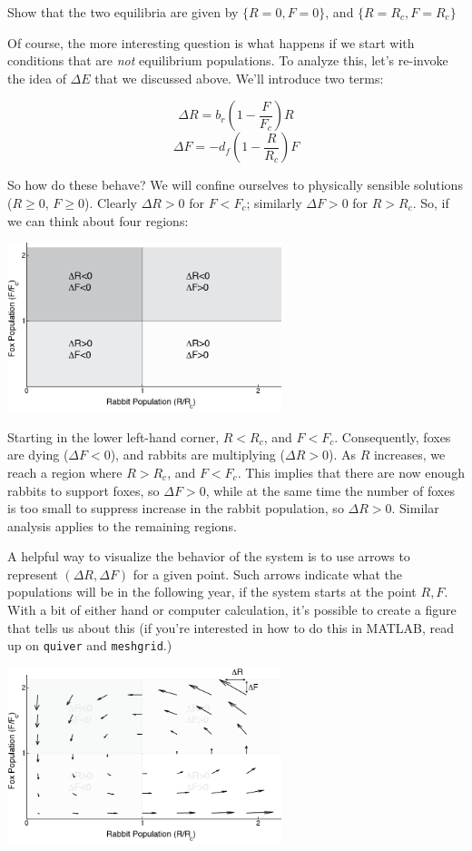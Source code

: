 \begin{del}
Show that the two equilibria are given by  $\{R=0, F=0\} $, and $\{R=R_c, F=R_c\} $ 
\end{del}

Of course, the more interesting question is what happens if we start with conditions that are {\it not} equilibrium populations.  To analyze this, let's re-invoke the idea of $\Delta E$ that we discussed above.  We'll introduce two terms:

$$\Delta R = b_r (1 - \frac{F}{F_c}) R$$
$$\Delta F= - d_f (1-\frac{R}{R_c}) F$$

So how do these behave?  We will confine ourselves to physically sensible solutions ($R\geq 0$, $F\geq 0$).  Clearly $\Delta R >0$ for $F<F_c$; similarly $\Delta F  > 0$ for $R>R_c$.  So, if we can think about four regions:

\beforefig
\centerline{\includegraphics[width=8cm]{figs/FoxRabbitPhasePlaneRegions}}
\afterfig

Starting in the lower left-hand corner, $R<R_c$, and $F<F_c$.  Consequently, foxes are dying ($\Delta F<0$), and rabbits are multiplying ($\Delta R>0$).  As $R$ increases, we reach a region where  $R>R_c$, and $F<F_c$.  This implies that there are now enough rabbits to support foxes, so $\Delta F>0$, while at the same time the number of foxes is too small to suppress increase in the rabbit population, so $\Delta R>0$.  Similar analysis applies to the remaining regions.

A helpful way to visualize the behavior of the system is to use arrows to represent $(\Delta R, \Delta F)$ for a given point.  Such arrows indicate what the populations will be in the following year, if the system starts at the point $R,F$.  With a bit of either hand or computer calculation, it's possible to create a figure that tells us about this (if you're interested in how to do this in MATLAB, read up on {\tt quiver} and {\tt meshgrid}.)

\beforefig
\centerline{
\includegraphics[width=8cm]{figs/FoxRabbitPhasePlaneRegionsWithQuiver.png}}
\afterfig



